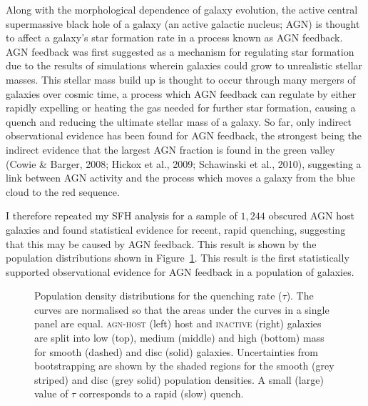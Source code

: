 \documentclass[12pt]{article}
\begin{document}
Along with the morphological dependence of galaxy evolution, the active central supermassive black hole of a galaxy (an active galactic nucleus; AGN) is thought to affect a galaxy's star formation rate in a process known as AGN feedback. AGN feedback was first suggested as a mechanism for regulating star formation due to the results of simulations wherein galaxies could grow to unrealistic stellar masses. This stellar mass build up is thought to occur through many mergers of galaxies over cosmic time, a process which AGN feedback can regulate by either rapidly expelling or heating the gas needed for further star formation, causing a quench and reducing the ultimate stellar mass of a galaxy. So far, only indirect observational evidence has been found for AGN feedback, the strongest being the indirect evidence that the largest AGN fraction is found in the green valley (Cowie \& Barger, 2008; Hickox et al., 2009; Schawinski et al., 2010), suggesting a link between AGN activity and the process which moves a galaxy from the blue cloud to the red sequence.

I therefore repeated my SFH analysis for a sample of $1,244$ obscured AGN host galaxies and found statistical evidence for recent, rapid quenching, suggesting that this may be caused by AGN feedback. This result is shown by the population distributions shown in Figure~\ref{fig:agnfeedback}. This result is the first statistically supported observational evidence for AGN feedback in a population of galaxies. 

\begin{figure}
\caption[Quenching rate population density distributions for the \textsc{agn-host} and \textsc{inactive} samples]{Population density distributions for the quenching rate ($\tau$). The curves are normalised so that the areas under the curves in a single panel are equal. \textsc{agn-host} (left) host and \textsc{inactive} (right) galaxies are split into low (top), medium (middle) and high (bottom) mass for smooth (dashed) and disc (solid) galaxies. Uncertainties from bootstrapping are shown by the shaded regions for the smooth (grey striped) and disc (grey solid) population densities. A small (large) value of $\tau$ corresponds to a rapid (slow) quench.}
\label{fig:agnfeedback}
\end{figure}
\end{document}
